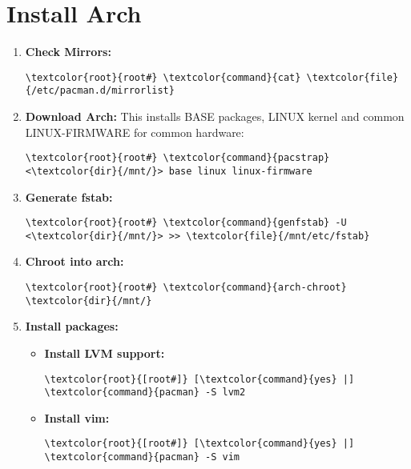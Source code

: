 \documentclass[10pt, a4paper, onecolumn, openany]{book} %
\begin{document}
\section{Install Arch}
\begin{enumerate}
    \item \textbf{Check Mirrors:}
\begin{Verbatim}[commandchars=\\\{\}]
\textcolor{root}{root#} \textcolor{command}{cat} \textcolor{file}{/etc/pacman.d/mirrorlist}
\end{Verbatim}

    \item \textbf{Download Arch:}
\newline This installs BASE packages, LINUX kernel and common LINUX-FIRMWARE for common hardware:
\begin{Verbatim}[commandchars=\\\{\}]
\textcolor{root}{root#} \textcolor{command}{pacstrap} <\textcolor{dir}{/mnt/}> base linux linux-firmware
\end{Verbatim}

    \item \textbf{Generate fstab:}
\begin{Verbatim}[commandchars=\\\{\}]
\textcolor{root}{root#} \textcolor{command}{genfstab} -U <\textcolor{dir}{/mnt/}> >> \textcolor{file}{/mnt/etc/fstab}
\end{Verbatim}

    \item \textbf{Chroot into arch:}
\begin{Verbatim}[commandchars=\\\{\}]
\textcolor{root}{root#} \textcolor{command}{arch-chroot} \textcolor{dir}{/mnt/}
\end{Verbatim}

    \item \textbf{Install packages:}
    \begin{itemize}
        \item \textbf{Install LVM support:}
\begin{Verbatim}[commandchars=\\\{\}]
\textcolor{root}{[root#]} [\textcolor{command}{yes} |] \textcolor{command}{pacman} -S lvm2
\end{Verbatim}
        \item \textbf{Install vim:}
\begin{Verbatim}[commandchars=\\\{\}]
\textcolor{root}{[root#]} [\textcolor{command}{yes} |] \textcolor{command}{pacman} -S vim
\end{Verbatim}
    \end{itemize}


\end{enumerate}
\end{document}
